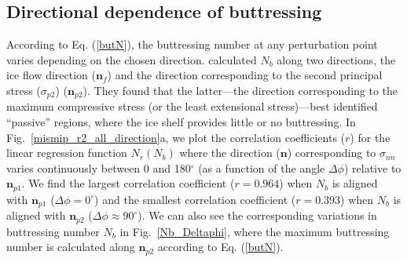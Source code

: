\documentclass[tc, manuscript]{copernicus}
\begin{document}
\subsection{Directional dependence of buttressing}\label{directional_buttressing}

According to Eq. (\ref{butN}), the buttressing number at any perturbation point varies depending on the chosen direction. \citet{furst2016} calculated $N_b$ along two directions, the ice flow direction ($\mathbf{n}_f$) and the direction corresponding to the second principal stress ($\sigma_{p2}$) ($\mathbf{n}_{p2}$). They found that the latter---the direction corresponding to the maximum compressive stress (or the least extensional stress)---best identified ``passive'' regions, where the ice shelf provides little or no buttressing. In Fig.~\ref{mismip_r2_all_direction}a, we plot the correlation coefficients ($r$) for the linear regression function $N_r\left(N_b\right)$ where the direction ($\textbf{n}$) corresponding to $\sigma_{nn}$ varies continuously between 0 and 180$^\circ$ (as a function of the angle $\Delta \phi$) relative to $\mathbf{n}_{p1}$. We find the largest correlation coefficient ($r=0.964$) when $N_b$ is aligned with $\mathbf{n}_{p1}$ ($\Delta \phi=0^\circ$) and the smallest correlation coefficient ($r=0.393$) when $N_b$ is aligned with $\mathbf{n}_{p2}$ ($\Delta \phi\approx 90^\circ$). We can also see the corresponding variations in buttressing number $N_b$ in Fig.~\ref{Nb_Deltaphi}, where the maximum buttressing number is calculated along $\mathbf{n}_{p2}$ according to Eq. (\ref{butN}).

\end{document}
